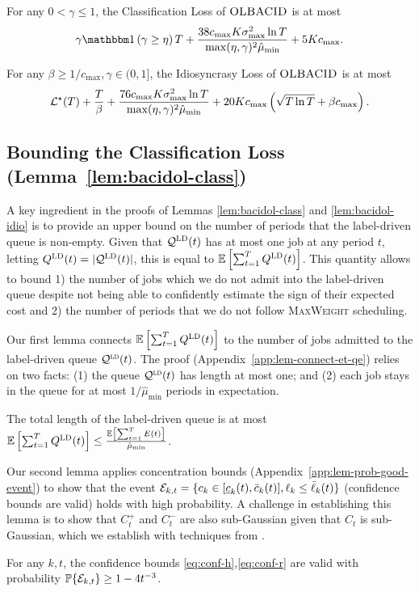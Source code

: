 \begin{lemma}\label{lem:bacidol-class}
For any $0 < \gamma \leq 1$, the Classification Loss of $\textsc{OLBACID}$ is at most 
\[
\gamma \indic{\gamma \geq \eta} T + \frac{38c_{\max}K\sigma^2_{\max}\ln T}{\max(\eta,\gamma)^2\hat{\mu}_{\min}} + 5Kc_{\max}.
\]
\end{lemma}
\begin{lemma}\label{lem:bacidol-idio}
For any $\beta \geq 1 / c_{\max}, \gamma \in (0,1]$, the Idiosyncrasy Loss of $\textsc{OLBACID}$ is at most
\[
\mathcal{L}^\star(T) + \frac{T}{\beta}+\frac{76c_{\max}K\sigma^2_{\max}\ln T}{\max(\eta,\gamma)^2\hat{\mu}_{\min}}+20Kc_{\max}\left(\sqrt{T\ln T} + \beta c_{\max}\right).
\]
\end{lemma}

\subsection{Bounding the Classification Loss (Lemma~\ref{lem:bacidol-class})}\label{sec:bacidol-class}
A key ingredient in the proofs of Lemmas  \ref{lem:bacidol-class} and \ref{lem:bacidol-idio} is to provide an upper bound on the number of periods that the label-driven queue is non-empty. Given that $\mathcal{Q}^{\mathcal{\textsc{LD}}}(t)$ has at most one job at any period $t$, letting $Q^{\mathcal{\textsc{LD}}}(t) = |\mathcal{Q}^{\mathcal{\textsc{LD}}}(t)|$, this is equal to $\mathbb E\left[\sum_{t=1}^T Q^{\mathcal{\textsc{LD}}}(t)\right]$. This quantity allows to bound 1) the number of jobs which we do not admit into the label-driven queue despite not being able to confidently estimate the sign of their expected cost and 2) the number of periods that we do not follow \textsc{MaxWeight} scheduling.

Our first lemma connects $\mathbb E\left[\sum_{t=1}^T Q^{\mathcal{\textsc{LD}}}(t)\right]$ to the number of jobs admitted to the label-driven queue $\mathcal{Q}^{\textsc{ld}}(t)$. The proof (Appendix~\ref{app:lem-connect-et-qe}) relies on two facts: (1) the queue $\mathcal{Q}^{\textsc{ld}}(t)$ has length at most one; and (2) each job stays in the queue for at most $1 / \hat{\mu}_{\min}$ periods in expectation. 
\begin{lemma}\label{lem:connect-et-qe}
The total length of the label-driven queue is at most $\mathbb E\left[\sum_{t=1}^T Q^{\mathcal{\textsc{LD}}}(t)\right] \leq \frac{\mathbb E\left[\sum_{t=1}^TE(t)\right]}{\hat{\mu}_{\min}}$.
\end{lemma}
Our second lemma applies concentration bounds (Appendix~\ref{app:lem-prob-good-event}) to show that the event $\mathcal{E}_{k,t} = \{c_k \in [\underline{c}_k(t),\bar{c}_k(t)],\ell_k \leq \bar{\ell}_k(t)\}$ (confidence bounds are valid) holds with high probability. A challenge in establishing this lemma is to show that $C_t^+$ and $C_t^-$ are also sub-Gaussian given that $C_t$ is sub-Gaussian, which we establish with techniques from \cite{kontorovich2014concentration}.
\begin{lemma}\label{lem:prob-good-event}
For any $k,t$, the confidence bounds \eqref{eq:conf-h},\eqref{eq:conf-r} are valid with probability $\mathbb{P}\{\mathcal{E}_{k,t}\} \geq 1 - 4t^{-3}$.
\end{lemma}

